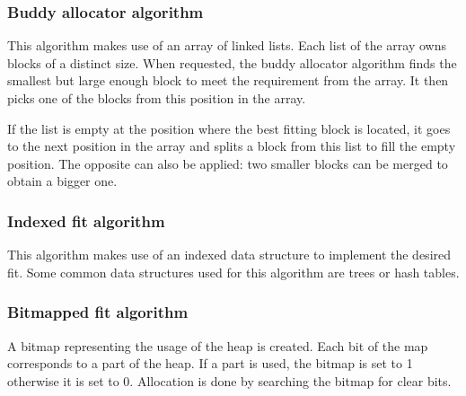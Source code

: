 \subsubsection{Buddy allocator algorithm}
This algorithm makes use of an array of linked lists.
Each list of the array owns blocks of a distinct size.
When requested, the buddy allocator algorithm finds the smallest but large enough block to meet the requirement from the array.
It then picks one of the blocks from this position in the array.

If the list is empty at the position where the best fitting block is located, it goes to the next position in the array
and splits a block from this list to fill the empty position.
The opposite can also be applied: two smaller blocks can be merged to obtain a bigger one.

\subsubsection{Indexed fit algorithm}
This algorithm makes use of an indexed data structure to implement the desired fit.
Some common data structures used for this algorithm are trees or hash tables.

\subsubsection{Bitmapped fit algorithm}
A bitmap representing the usage of the heap is created.
Each bit of the map corresponds to a part of the heap.
If a part is used, the bitmap is set to 1 otherwise it is set to 0.
Allocation is done by searching the bitmap for clear bits.


